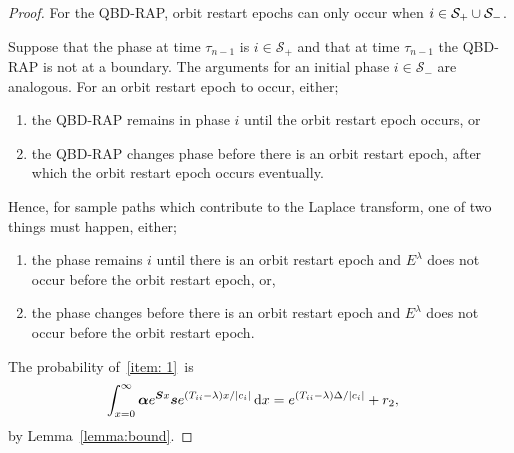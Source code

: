 \begin{proof}
	For the QBD-RAP, orbit restart epochs can only occur when \(i\in\mathcal S_+\cup\mathcal{S}_-\). 
	
	Suppose that the phase at time \(\tau_{n-1}\) is \(i\in\mathcal S_+\) and that at time \(\tau_{n-1}\) the QBD-RAP is not at a boundary. The arguments for an initial phase \(i\in\mathcal S_-\) are analogous. For an orbit restart epoch to occur, either; 
	\begin{enumerate}
		\item the QBD-RAP remains in phase \(i\) until the orbit restart epoch occurs, or
		\item the QBD-RAP changes phase before there is an orbit restart epoch, after which the orbit restart epoch occurs eventually. 
	\end{enumerate}
	
	Hence, for sample paths which contribute to the Laplace transform, one of two things must happen, either; 
	\begin{enumerate}[a]
		\item the phase remains \(i\) until there is an orbit restart epoch and \(E^\lambda\) does not occur before the orbit restart epoch, or, \label{item: 1}
		\item the phase changes before there is an orbit restart epoch and \(E^\lambda\) does not occur before the orbit restart epoch. \label{item: 2}
	\end{enumerate}
	
	The probability of~\ref{item: 1}~is 
	\begin{align}
		\int_{x=0}^\infty \boldsymbol \alpha e^{\boldsymbol{S}x}\boldsymbol s e^{(T_{ii}-\lambda)x/|c_i|}\, \mathrm{d} x 
		&= e^{(T_{ii}-\lambda)\Delta/|c_i|} + r_2,\label{eqn: bnd this 12345}
	\end{align}
	by Lemma~\ref{lemma:bound}.
	

\end{proof}
